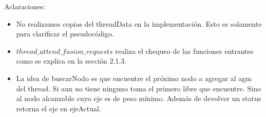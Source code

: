 \newpage

Aclaraciones:
\begin{itemize}
    \item No realizamos copias del threadData en la implementación. Esto es solamente para clarificar el pseudocódigo.
    \item $thread\_attend\_fusion\_requests$ realiza el chequeo de las funciones entrantes como se explica en la sección 2.1.3.
    \item La idea de buscarNodo es que encuentre el próximo nodo a agregar al agm del thread. Si aun no tiene ninguno toma el primero libre que encuentre. Sino al nodo alcanzable cuyo eje es de peso mínimo. Además de devolver un status retorna el eje en ejeActual.
\end{itemize}
